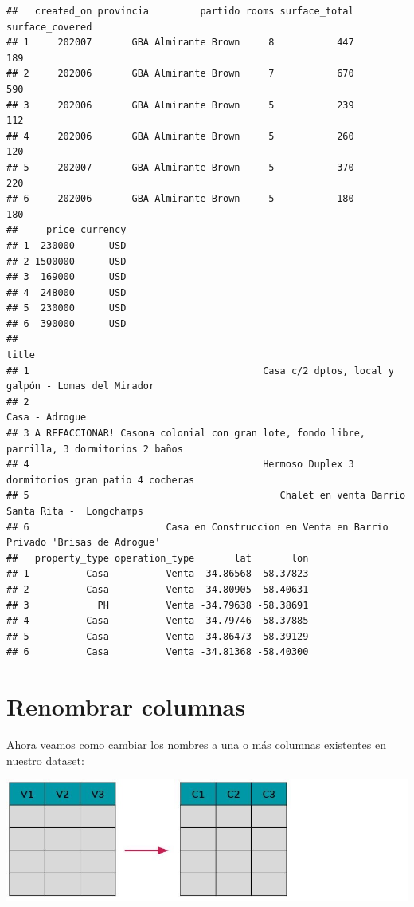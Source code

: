 \documentclass[
  spanish,
]{book}
\begin{document}
\begin{verbatim}
##   created_on provincia         partido rooms surface_total surface_covered
## 1     202007       GBA Almirante Brown     8           447             189
## 2     202006       GBA Almirante Brown     7           670             590
## 3     202006       GBA Almirante Brown     5           239             112
## 4     202006       GBA Almirante Brown     5           260             120
## 5     202007       GBA Almirante Brown     5           370             220
## 6     202006       GBA Almirante Brown     5           180             180
##     price currency
## 1  230000      USD
## 2 1500000      USD
## 3  169000      USD
## 4  248000      USD
## 5  230000      USD
## 6  390000      USD
##                                                                                        title
## 1                                         Casa c/2 dptos, local y galpón - Lomas del Mirador
## 2                                                                             Casa - Adrogue
## 3 A REFACCIONAR! Casona colonial con gran lote, fondo libre, parrilla, 3 dormitorios 2 baños
## 4                                         Hermoso Duplex 3 dormitorios gran patio 4 cocheras
## 5                                            Chalet en venta Barrio Santa Rita -  Longchamps
## 6                        Casa en Construccion en Venta en Barrio Privado 'Brisas de Adrogue'
##   property_type operation_type       lat       lon
## 1          Casa          Venta -34.86568 -58.37823
## 2          Casa          Venta -34.80905 -58.40631
## 3            PH          Venta -34.79638 -58.38691
## 4          Casa          Venta -34.79746 -58.37885
## 5          Casa          Venta -34.86473 -58.39129
## 6          Casa          Venta -34.81368 -58.40300
\end{verbatim}

\hypertarget{renombrar-columnas}{%
\section{Renombrar columnas}\label{renombrar-columnas}}

Ahora veamos como cambiar los nombres a una o más columnas existentes en nuestro dataset:

\includegraphics{images/tidyverse_renombrar.jpg}
\end{document}
